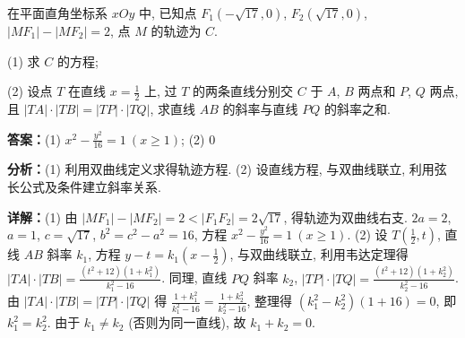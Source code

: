 \begin{question}[points=12]
在平面直角坐标系 $xOy$ 中, 已知点 $F_1(-\sqrt{17}, 0)$, $F_2(\sqrt{17}, 0)$, $|MF_1| - |MF_2| = 2$, 点 $M$ 的轨迹为 $C$.

(1) 求 $C$ 的方程;

(2) 设点 $T$ 在直线 $x = \frac{1}{2}$ 上, 过 $T$ 的两条直线分别交 $C$ 于 $A$, $B$ 两点和 $P$, $Q$ 两点, 且 $|TA| \cdot |TB| = |TP| \cdot |TQ|$, 求直线 $AB$ 的斜率与直线 $PQ$ 的斜率之和.
\begin{solution}
\textbf{答案：}(1) $x^2 - \frac{y^2}{16} = 1 \ (x \geq 1)$; (2) $0$

\textbf{分析：}(1) 利用双曲线定义求得轨迹方程. (2) 设直线方程, 与双曲线联立, 利用弦长公式及条件建立斜率关系.

\textbf{详解：}(1) 由 $|MF_1| - |MF_2| = 2 < |F_1F_2| = 2\sqrt{17}$, 得轨迹为双曲线右支. $2a = 2$, $a = 1$, $c = \sqrt{17}$, $b^2 = c^2 - a^2 = 16$, 方程 $x^2 - \frac{y^2}{16} = 1 \ (x \geq 1)$.
(2) 设 $T(\frac{1}{2}, t)$, 直线 $AB$ 斜率 $k_1$, 方程 $y - t = k_1(x - \frac{1}{2})$, 与双曲线联立, 利用韦达定理得 $|TA| \cdot |TB| = \frac{(t^2+12)(1+k_1^2)}{k_1^2-16}$. 同理, 直线 $PQ$ 斜率 $k_2$, $|TP| \cdot |TQ| = \frac{(t^2+12)(1+k_2^2)}{k_2^2-16}$. 由 $|TA| \cdot |TB| = |TP| \cdot |TQ|$ 得 $\frac{1+k_1^2}{k_1^2-16} = \frac{1+k_2^2}{k_2^2-16}$, 整理得 $(k_1^2 - k_2^2)(1+16)=0$, 即 $k_1^2 = k_2^2$. 由于 $k_1 \neq k_2$ (否则为同一直线), 故 $k_1 + k_2 = 0$.
\end{solution}
\end{question}

